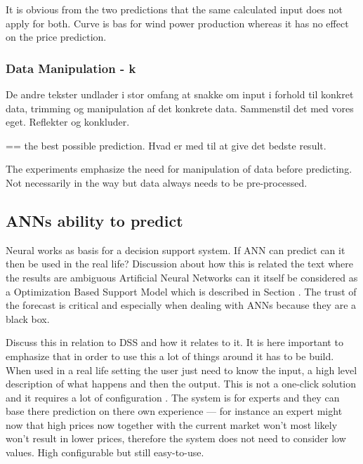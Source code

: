 It is obvious from the two predictions that the same calculated input does not apply for both. Curve is bas for wind power production whereas it has no effect on the price prediction.


\subsubsection{Data Manipulation - k}
De andre tekster undlader i stor omfang at snakke om input i forhold til konkret data, trimming og manipulation af det konkrete data. Sammenstil det med vores eget. Reflekter og konkluder.

== the best possible prediction. Hvad er med til at give det bedste result.

The experiments emphasize the need for manipulation of data before predicting. Not necessarily in the way but data always needs to be pre-processed. 

\subsection{ANNs ability to predict}


Neural works as basis for a decision support system. If ANN can predict can it then be used in the real life? Discussion about how this is related the text where the results are ambiguous 
Artificial Neural Networks can it itself be considered as a Optimization Based Support Model which is described in Section . The trust of the forecast is critical and especially when dealing with ANNs because they are a black box. 

Discuss this in relation to DSS and how it relates to it. It is here important to emphasize that in order to use this a lot of things around it has to be build. When used in a real life setting the user just need to know the input, a high level description of what happens and then the output.
This is not a one-click solution and it requires a lot of configuration . The system is for experts and they can base there prediction on there own experience --- for instance an expert might now that high prices now together with the current market won't most likely won't result in lower prices, therefore the system does not need to consider low values. High configurable but still easy-to-use.

